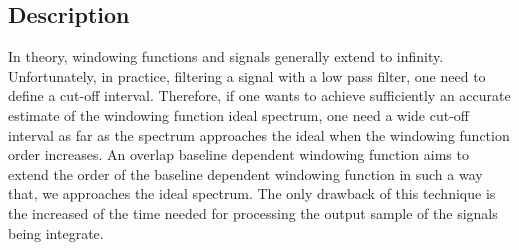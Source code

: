 \documentclass[useAMS,usenatbib]{mn2e}
\begin{document}
\subsection{Description}
In theory, windowing functions and signals generally extend to  infinity. Unfortunately, in practice, filtering a signal with a low pass 
filter, one need to define a cut-off interval. Therefore, if one  wants to achieve sufficiently an accurate  estimate of the 
windowing function ideal spectrum, one need a wide cut-off interval as far as the spectrum approaches the ideal when the windowing function 
order increases. An overlap baseline dependent windowing function aims to extend the order of the baseline dependent windowing function in 
such a way that, we approaches the ideal spectrum.
The only drawback of this technique is the increased of the time needed for processing the output sample of the signals being integrate.  
\end{document}
